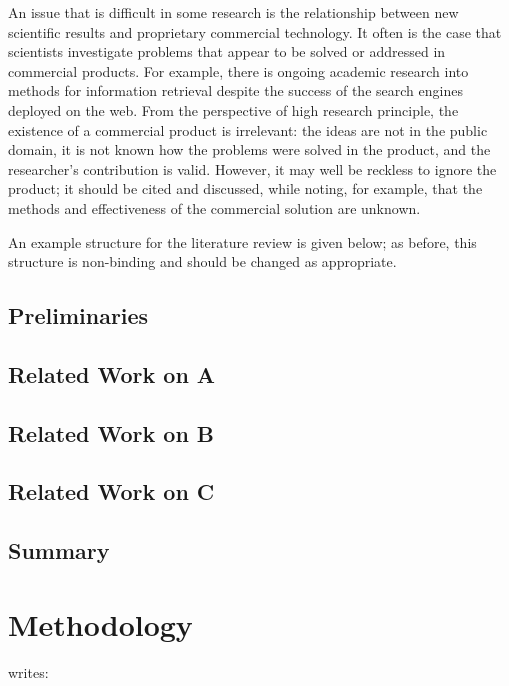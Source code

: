 \documentclass[a4paper,oneside,bibliography=totoc]{scrbook}
\begin{document}
{  An issue that is difficult in some research is the relationship between new
  scientific results and proprietary commercial technology. It often is the case
  that scientists investigate problems that appear to be solved or addressed in
  commercial products. For example, there is ongoing academic research into
  methods for information retrieval despite the success of the search engines
  deployed on the web. From the perspective of high research principle, the
  existence of a commercial product is irrelevant: the ideas are not in the
  public domain, it is not known how the problems were solved in the product,
  and the researcher's contribution is valid. However, it may well be reckless
  to ignore the product; it should be cited and discussed, while noting, for
  example, that the methods and effectiveness of the commercial solution are
  unknown. }

An example structure for the literature review is given below; as before, this
structure is non-binding and should be changed as appropriate.

\section{Preliminaries}
\label{sec:preliminaries}

\section{Related Work on A}
\label{sec:related_work_A}

\section{Related Work on B}

\section{Related Work on C}

\section{Summary}

\chapter{Methodology}
\citet{zobel2004} writes:
\end{document}
